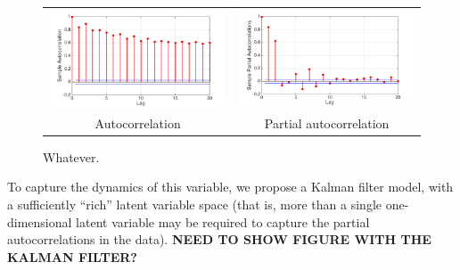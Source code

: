 \begin{figure}
\begin{center}
\begin{tabular}{c@{}c}
\includegraphics[scale=0.3]{./figures/VT_autoCorr_TRQ} &
\includegraphics[scale=0.3]{./figures/VT_partialAutoCorr_TRQ}  \\
Autocorrelation & Partial autocorrelation
\end{tabular}
\caption{\label{Figure:VTTorqueAutoCorr}  Whatever.}
\end{center}
\end{figure}


To capture the dynamics of this variable, we propose a Kalman filter model, with a sufficiently ``rich'' latent variable space (that is, more than a single one-dimensional latent variable may be required to capture the partial autocorrelations in the data).  {\bf NEED TO SHOW FIGURE WITH THE KALMAN FILTER?}



